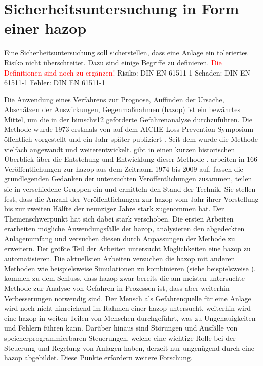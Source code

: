 \section{Sicherheitsuntersuchung in Form einer \ac{hazop}}\label{sec:sdt_hazop}
Eine Sicherheitsuntersuchung soll sicherstellen, dass eine Anlage ein toleriertes Risiko nicht \"uberschreitet. Dazu sind einige Begriffe zu definieren. \textcolor{red}{Die Definitionen sind noch zu erg\"anzen!} \newline
\glqq Risiko\grqq { }: DIN EN 61511-1\newline
\glqq Schaden\grqq { }: DIN EN 61511-1\newline 
\glqq Fehler\grqq { }: DIN EN 61511-1\newline

Die Anwendung eines Verfahrens zur Prognose, Auffinden der Ursache, Absch\"atzen der Auswirkungen, Gegenma\ss{}nahmen (\ac{hazop}) ist ein bew\"ahrtes Mittel, um die in der \ac{bimschv12} geforderte Gefahrenanalyse durchzuf\"uhren. Die Methode wurde 1973 erstmals von \citeauthor{Lawley_1974} auf dem AICHE Loss Prevention Symposium \"offentlich vorgestellt und ein Jahr sp\"ater publiziert \cite{Lawley_1974}. Seit dem wurde die Methode vielfach angewandt und weiterentwickelt. \newline
\citeauthor{Kletz_1997} gibt in  einen kurzen historischen \"Uberblick \"uber die Entstehung und Entwicklung dieser Methode \cite{Kletz_1997}. \citeauthor{Dunjo_2010} arbeiten in  \cite{Dunjo_2010} 166 Ver\"offentlichungen zur \ac{hazop} aus dem Zeitraum 1974 bis 2009 auf, fassen die grundlegenden Gedanken der untersuchten Ver\"offentlichungen zusammen, teilen sie in verschiedene Gruppen ein und ermitteln den Stand der Technik. Sie stellen fest, dass die Anzahl der Ver\"offentlichungen zur \ac{hazop} vom Jahr ihrer Vorstellung bis zur zweiten H\"alfte der neunziger Jahre stark zugenommen hat. Der Themenschwerpunkt hat sich dabei stark verschoben. Die ersten Arbeiten erarbeiten m\"ogliche Anwendungsf\"alle der \ac{hazop}, analysieren den abgedeckten Anlagenumfang und versuchen diesen durch Anpassungen der Methode zu erweitern. Der gr\"o\ss{}te Teil der Arbeiten untersucht M\"oglichkeiten eine \ac{hazop} zu automatisieren. Die aktuellsten Arbeiten versuchen die \ac{hazop} mit anderen Methoden wie beispielsweise Simulationen zu kombinieren (siehe beispielsweise \cite{Li_2013}). \citeauthor{Dunjo_2010} kommen zu dem Schluss, dass \ac{hazop} zwar bereits die am meisten untersuchte Methode zur Analyse von Gefahren in Prozessen ist, dass aber weiterhin Verbesserungen notwendig sind. Der Mensch als Gefahrenquelle f\"ur eine Anlage wird noch nicht hinreichend im Rahmen einer \ac{hazop} untersucht, weiterhin wird eine \ac{hazop} in weiten Teilen von Menschen durchgef\"uhrt, was zu Ungenauigkeiten und Fehlern f\"uhren kann. Dar\"uber hinaus sind St\"orungen und Ausf\"alle von speicherprogrammierbaren Steuerungen, welche eine wichtige Rolle bei der Steuerung und Regelung von Anlagen haben, derzeit nur ungen\"ugend durch eine \ac{hazop} abgebildet. Diese Punkte erfordern weitere Forschung.

